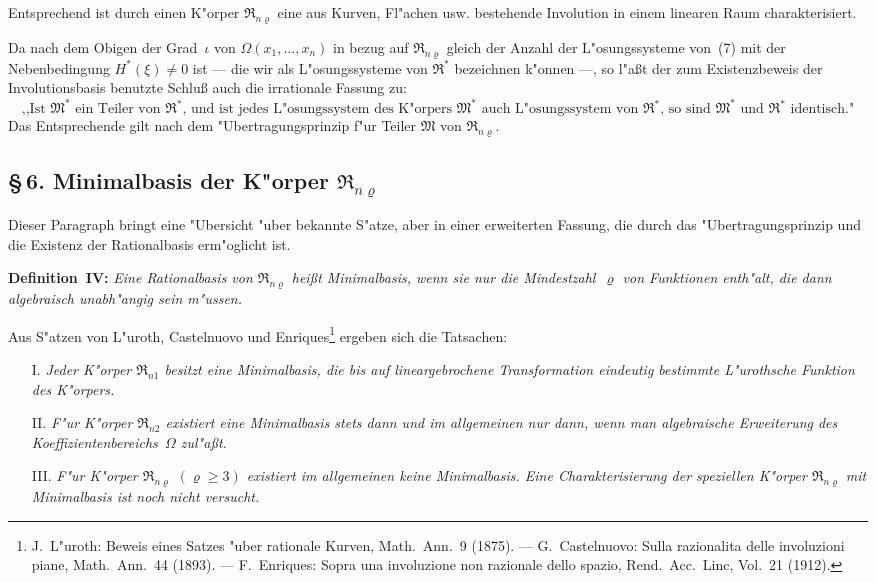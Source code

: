 \documentclass[11pt,a4paper]{article}
\begin{document}
Entsprechend ist durch einen K"{o}rper $\mathfrak{R}_{n\varrho}$ eine aus Kurven, Fl"{a}chen usw.
bestehende Involution in einem linearen Raum charakterisiert.

Da nach dem Obigen der Grad~$\iota$ von $\Omega(x_{1},\dots,x_{n})$ in bezug auf $\mathfrak{R}_{n\varrho}$
gleich der Anzahl der L"{o}sungssysteme von~(7) mit der Nebenbedingung
$H^{*}(\xi)\neq 0$ ist --- die wir als L"{o}sungssysteme von $\mathfrak{R}^{*}$ bezeichnen k"{o}nnen ---,
so l"{a}\ss{}t der zum Existenzbeweis der Involutionsbasis benutzte Schlu\ss{} auch
die irrationale Fassung zu:
\[\text{,,Ist }\mathfrak{M}^{*}\text{ ein Teiler von }\mathfrak{R}^{*}\text{, und ist jedes L"{o}sungssystem des K"{o}rpers }\mathfrak{M}^{*}\text{ auch
L"{o}sungssystem von }\mathfrak{R}^{*}\text{, so sind }\mathfrak{M}^{*}\text{ und }\mathfrak{R}^{*}\text{ identisch."{}}\]
Das Entsprechende gilt nach dem "{U}bertragungsprinzip f"{u}r Teiler $\mathfrak{M}$ von $\mathfrak{R}_{n\varrho}$.

\subsection*{\S\,6. Minimalbasis der K"{o}rper $\mathfrak{R}_{n\varrho}$}

Dieser Paragraph bringt eine "{U}bersicht "{u}ber bekannte S"{a}tze, aber in
einer erweiterten Fassung, die durch das "{U}bertragungsprinzip und die
Existenz der Rationalbasis erm"{o}glicht ist.

\medskip
\noindent
\textbf{Definition~IV:} \emph{Eine Rationalbasis von $\mathfrak{R}_{n\varrho}$ hei\ss{}t \emph{Minimalbasis},
wenn sie nur die Mindestzahl~$\varrho$ von Funktionen enth"{a}lt, die dann algebraisch
unabh"{a}ngig sein m"{u}ssen.}

Aus S"{a}tzen von L"{u}roth, Castelnuovo und Enriques\footnote{J.~L"{u}roth:
Beweis eines Satzes "{u}ber rationale Kurven, Math.\ Ann.\ 9 (1875). ---
G.~Castelnuovo: Sulla razionalita delle involuzioni piane, Math.\ Ann.\ 44 (1893). ---
F.~Enriques: Sopra una involuzione non razionale dello spazio, Rend.\ Acc.\ Linc,
Vol.\ 21 (1912).} ergeben sich die Tatsachen:
\begin{enumerate}
\item[I.] \emph{Jeder K"{o}rper $\mathfrak{R}_{n1}$ besitzt eine Minimalbasis, die bis auf
lineargebrochene Transformation eindeutig bestimmte L"{u}rothsche Funktion
des K"{o}rpers.}
\item[II.] \emph{F"{u}r K"{o}rper $\mathfrak{R}_{n2}$ existiert eine Minimalbasis stets dann und im
allgemeinen nur dann, wenn man algebraische Erweiterung des
Koeffizientenbereichs~$\Omega$ zul"{a}\ss{}t.}
\item[III.] \emph{F"{u}r K"{o}rper $\mathfrak{R}_{n\varrho}$ $(\varrho\ge 3)$ existiert im allgemeinen keine
Minimalbasis. Eine Charakterisierung der speziellen K"{o}rper $\mathfrak{R}_{n\varrho}$
mit Minimalbasis ist noch nicht versucht.}
\end{enumerate}
\end{document}
